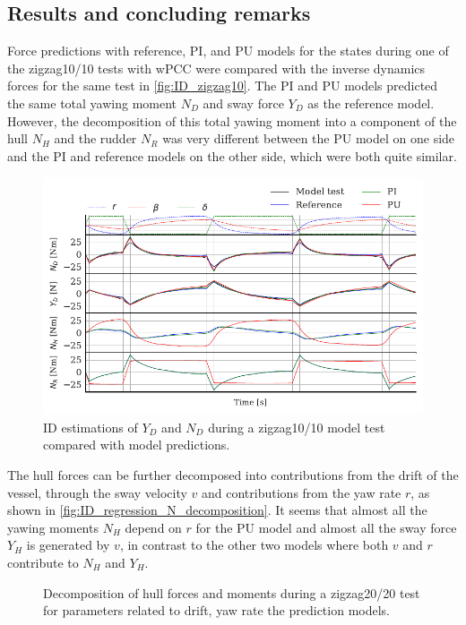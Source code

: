 \subsection*{Results and concluding remarks}
Force predictions with reference, PI, and PU models for the states during one of the zigzag10/10 tests with wPCC were compared with the inverse dynamics forces for the same test in \autoref{fig:ID_zigzag10}. The PI and PU models predicted the same total yawing moment $N_D$ and sway force $Y_D$ as the reference model. However, the decomposition of this total yawing moment into a component of the hull $N_H$ and the rudder $N_R$ was very different between the PU model on one side and the PI and reference models on the other side, which were both quite similar.
\begin{figure}[h]
    \centering
    \includegraphics{kappa/images/results.ID_zigzag10.pdf}
    \caption{ID estimations of $Y_D$ and $N_D$ during a zigzag10/10 model test compared with model predictions.}
    \label{fig:ID_zigzag10}
\end{figure}
The hull forces can be further decomposed into contributions from the drift of the vessel, through the sway velocity $v$ and contributions from the yaw rate $r$, as shown in \autoref{fig:ID_regression_N_decomposition}. It seems that almost all the yawing moments $N_H$ depend on $r$ for the PU model and almost all the sway force $Y_H$ is generated by $v$, in contrast to the other two models where both $v$ and $r$ contribute to $N_H$ and $Y_H$.
\begin{figure}[h]
    \begin{center}
        
        \caption{Decomposition of hull forces and moments during a zigzag20/20 test for parameters related to drift, yaw rate the prediction models.}
        \label{fig:ID_regression_N_decomposition}
    \end{center}
\end{figure}
